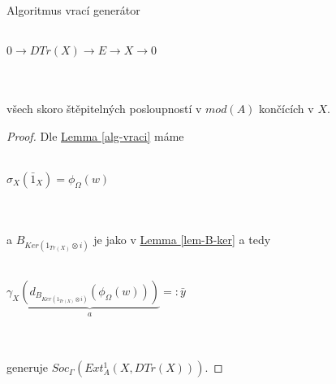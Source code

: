         \centerline{  }\,
      
      \begin{thm}
        Algoritmus vrací generátor \\\\
        \centerline{$0 \rightarrow DTr(X) \rightarrow E \rightarrow X \rightarrow 0$} 
        \\\\
        všech skoro štěpitelných posloupností v $mod(A)$ končících v $X$.
      \end{thm}
      \begin{proof}
        Dle \hyperref[alg-vraci]{Lemma \ref*{alg-vraci}} máme
        \\\\\centerline{$\sigma_X(\bar 1_X)=\phi_\Omega(w)$}\\\\
        a $B_{Ker(1_{Tr(X)}\otimes i)}$ je jako v  
        \hyperref[lem-B-ker]{Lemma \ref*{lem-B-ker}} a tedy 
        \\\\\centerline{$\gamma_X \underbrace{( d_{B_{Ker(1_{Tr(X)}\otimes i)}}( \phi_\Omega(w) ) )}_{a}=: \bar y$}\\\\
        generuje $Soc_\Gamma(Ext_A^1(X,DTr(X)))$.
        

\end{proof}
